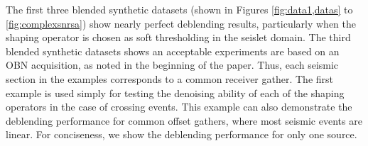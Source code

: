 The first three blended synthetic datasets (shown in Figures \ref{fig:data1,datas} to \ref{fig:complexsnrsa}) show nearly perfect deblending results, particularly when the shaping operator is chosen as soft thresholding in the seislet domain. The third blended synthetic datasets shows an acceptable experiments are based on an OBN acquisition, as noted in the beginning of the paper. Thus, each seismic section in the examples corresponds to a common receiver gather. The first example is used simply for testing the denoising ability of each of the shaping operators in the case of crossing events. This example can also demonstrate the deblending performance for common offset gathers, where most seismic events are linear. For conciseness, we show the deblending performance for only one source.


